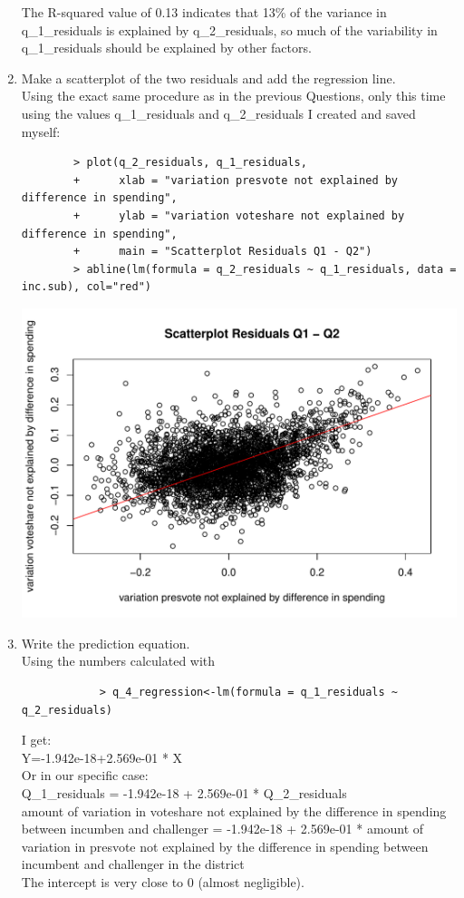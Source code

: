 \documentclass[12pt,letterpaper]{article}
\begin{document}
\begin{enumerate}
	The R-squared value of 0.13 indicates that 13\% of the variance in q\_1\_residuals is explained by q\_2\_residuals, so much of the variability in q\_1\_residuals should be explained by other factors.
	
		\item Make a scatterplot of the two residuals and add the regression line. 	\\
		
		Using the exact same procedure as in the previous Questions, only this time using the values q\_1\_residuals and q\_2\_residuals I created and saved myself:
		\begin{verbatim}
		> plot(q_2_residuals, q_1_residuals,
		+      xlab = "variation presvote not explained by difference in spending",
		+      ylab = "variation voteshare not explained by difference in spending",
		+      main = "Scatterplot Residuals Q1 - Q2")
		> abline(lm(formula = q_2_residuals ~ q_1_residuals, data = inc.sub), col="red")
	\end{verbatim}
	\includegraphics[width=\textwidth,height=\textheight,keepaspectratio]{Q_4_Plot}
		\item Write the prediction equation. \\
		
		Using the numbers calculated with
		\begin{verbatim}
			> q_4_regression<-lm(formula = q_1_residuals ~ q_2_residuals)
		\end{verbatim}
		I get: \\
		Y=-1.942e-18+2.569e-01 * X \\
		Or in our specific case: \\
		Q\_1\_residuals = -1.942e-18 + 2.569e-01 * Q\_2\_residuals \\
		amount of variation in voteshare not explained by the difference in spending between incumben and challenger = -1.942e-18 + 2.569e-01 * amount of variation in presvote not explained by the difference in spending between incumbent and challenger in the district \\
		The intercept is very close to 0 (almost negligible). 
	\end{enumerate}
	
\end{document}
